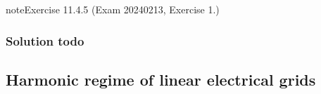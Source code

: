 \documentclass[letterpaper,10pt,english]{jupyterBook}
\begin{document}
\begin{sphinxadmonition}{note}{Exercise 11.4.5 (Exam 2024\sphinxhyphen{}02\sphinxhyphen{}13, Exercise 1.)}



\begin{figure}[htbp]
\centering

\noindent{}
\end{figure}
\subsubsection*{Solution \sphinxhyphen{} todo}
\end{sphinxadmonition}

\sphinxstepscope


\subsection{Harmonic regime of linear electrical grids}
\label{\detokenize{ch/electrical-engineering-exercises-harmonic:harmonic-regime-of-linear-electrical-grids}}\label{\detokenize{ch/electrical-engineering-exercises-harmonic:classical-electromagnetism-electrical-engineering-exercises-harmonic}}\label{\detokenize{ch/electrical-engineering-exercises-harmonic::doc}} \label{exercise:exam-25-02-11-exe-02}
\end{document}
